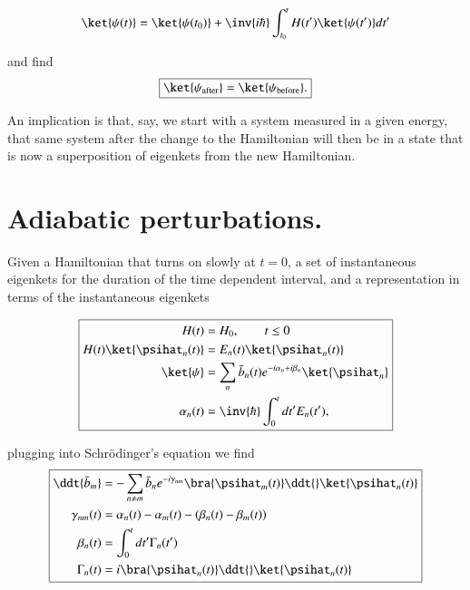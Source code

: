 \begin{equation}\label{eqn:qmTwoReview:570}
\ket{\psi(t)} = \ket{\psi(t_0)} + \inv{i\hbar} \int_{t_0}^t H(t') \ket{\psi(t')} dt'
\end{equation}

and find
\begin{equation}\label{eqn:qmTwoReview:590}
\boxed{
\ket{\psi_\text{after}} = \ket{\psi_\text{before}}.
}
\end{equation}

An implication is that, say, we start with a system measured in a given energy, that same system after the change to the Hamiltonian will then be in a state that is now a superposition of eigenkets from the new Hamiltonian.

\section{Adiabatic perturbations.}

Given a Hamiltonian that turns on slowly at $t=0$, a set of instantaneous eigenkets for the duration of the time dependent interval, and a representation in terms of the instantaneous eigenkets

\begin{equation}\label{eqn:qmTwoReview:610}
\boxed{
\begin{aligned}
H(t) &= H_0, \qquad t \le 0 \\
H(t) \ket{\psihat_n(t)} &= E_n(t) \ket{\psihat_n(t)} \\
\ket{\psi} &= \sum_n \bar{b}_n(t) e^{-i\alpha_n + i \beta_n} \ket{\psihat_n} \\
\alpha_n(t) &= \inv{\hbar} \int_0^t dt' E_n(t'),
\end{aligned}
}
\end{equation}

plugging into Schr\"{o}dinger's equation we find
\begin{equation}\label{eqn:qmTwoReview:630}
\boxed{
\begin{aligned}
\ddt{\bar{b}_m} &= - \sum_{n \ne m} \bar{b}_n e^{-i \gamma_{nm} } \bra{\psihat_m(t)} \ddt{} \ket{\psihat_n(t)}  \\
\gamma_{nm}(t) &= \alpha_n(t) - \alpha_m(t) - (\beta_n(t) - \beta_m(t)) \\
\beta_n(t) &= \int_0^t dt' \Gamma_n(t') \\
\Gamma_n(t) &= i \bra{\psihat_n(t)} \ddt{} \ket{\psihat_n(t)} \\
\end{aligned}
}
\end{equation}

